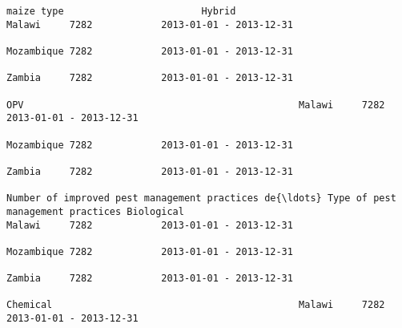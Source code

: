 \documentclass[11pt]{article}
\begin{document}
\begin{Verbatim}[commandchars=\\\{\}]
                                                                                                                            maize type                        Hybrid                                             Malawi     7282            2013-01-01 - 2013-12-31   
                                                                                                                                                                                                                 Mozambique 7282            2013-01-01 - 2013-12-31   
                                                                                                                                                                                                                 Zambia     7282            2013-01-01 - 2013-12-31   
                                                                                                                                                              OPV                                                Malawi     7282            2013-01-01 - 2013-12-31   
                                                                                                                                                                                                                 Mozambique 7282            2013-01-01 - 2013-12-31   
                                                                                                                                                                                                                 Zambia     7282            2013-01-01 - 2013-12-31   
                                                                         Number of improved pest management practices de{\ldots} Type of pest management practices Biological                                         Malawi     7282            2013-01-01 - 2013-12-31   
                                                                                                                                                                                                                 Mozambique 7282            2013-01-01 - 2013-12-31   
                                                                                                                                                                                                                 Zambia     7282            2013-01-01 - 2013-12-31   
                                                                                                                                                              Chemical                                           Malawi     7282            2013-01-01 - 2013-12-31   

\end{Verbatim}
\end{document}
